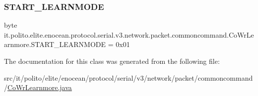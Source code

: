 \subsubsection{\texorpdfstring{S\+T\+A\+R\+T\+\_\+\+L\+E\+A\+R\+N\+M\+O\+DE}{START\_LEARNMODE}}
{\footnotesize\ttfamily byte it.\+polito.\+elite.\+enocean.\+protocol.\+serial.\+v3.\+network.\+packet.\+commoncommand.\+Co\+Wr\+Learnmore.\+S\+T\+A\+R\+T\+\_\+\+L\+E\+A\+R\+N\+M\+O\+DE = 0x01\hspace{0.3cm}{\ttfamily [static]}}



The documentation for this class was generated from the following file\+:\begin{DoxyCompactItemize}
\item 
src/it/polito/elite/enocean/protocol/serial/v3/network/packet/commoncommand/\hyperlink{_co_wr_learnmore_8java}{Co\+Wr\+Learnmore.\+java}\end{DoxyCompactItemize}
